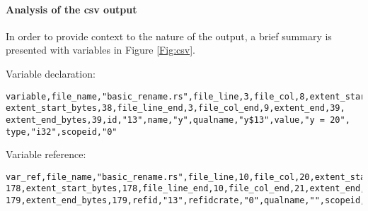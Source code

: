 
\paragraph{Analysis of the csv output}
In order to provide context to the nature of the output, a brief summary is presented with variables in Figure \ref{Fig:csv}.

\begin{figure*}
\vspace{5mm}
\noindent
Variable declaration:
\begin{verbatim}
variable,file_name,"basic_rename.rs",file_line,3,file_col,8,extent_start,38,
extent_start_bytes,38,file_line_end,3,file_col_end,9,extent_end,39,
extent_end_bytes,39,id,"13",name,"y",qualname,"y$13",value,"y = 20",
type,"i32",scopeid,"0"
\end{verbatim}

\noindent
Variable reference:
\begin{verbatim}
var_ref,file_name,"basic_rename.rs",file_line,10,file_col,20,extent_start,
178,extent_start_bytes,178,file_line_end,10,file_col_end,21,extent_end,
179,extent_end_bytes,179,refid,"13",refidcrate,"0",qualname,"",scopeid,"4"
\end{verbatim}

\caption{Example csv output from \emph{-Zsave-analysis}}
\label{Fig:csv}
\end{figure*}

